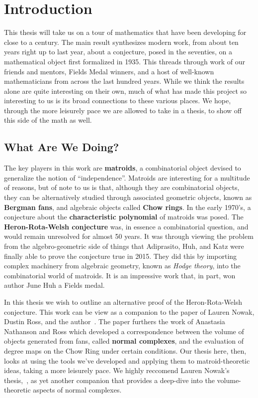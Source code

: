 \documentclass[12pt,oneside]{../../sfsuthesis}
\begin{document}
\chapter{Introduction}

This thesis will take us on a tour of mathematics that have been developing for close to a century.
The main result synthesizes modern work, from about ten years right up to last year, about a conjecture, posed in the seventies, on a mathematical object first formalized in 1935.
This threads through work of our friends and mentors, Fields Medal winners, and a host of well-known mathematicians from across the last hundred years.
While we think the results alone are quite interesting on their own, much of what has made this project so interesting to us is its broad connections to these various places.
We hope, through the more leisurely pace we are allowed to take in a thesis, to show off this side of the math as well.

\section{What Are We Doing?}

The key players in this work are \textbf{matroids}, a combinatorial object devised to generalize the notion of ``independence''.
Matroids are interesting for a multitude of reasons, but of note to us is that, although they are combinatorial objects, they can be alternatively studied through associated geometric objects, known as \textbf{Bergman fans}, and algebraic objects called \textbf{Chow rings}.
In the early 1970's, a conjecture about the \textbf{characteristic polynomial} of matroids was posed.
The \textbf{Heron-Rota-Welsh conjecture} was, in essence a combinatorial question, and would remain unresolved for almost 50 years.
It was through viewing the problem from the algebro-geometric side of things that Adiprasito, Huh, and Katz were finally able to prove the conjecture true in 2015.
They did this by importing complex machinery from algebraic geometry, known as \emph{Hodge theory}, into the combinatorial world of matroids.
It is an impressive work that, in part, won author June Huh a Fields medal.

In this thesis we wish to outline an alternative proof of the Heron-Rota-Welsh conjecture.
This work can be view as a companion to the paper of Lauren Nowak, Dustin Ross, and the author~\cite{nowakMixedVolumesNormal2023}.
The paper furthers the work of Anastasia Nathanson and Ross which developed a correspondence between the volume of objects generated from fans, called \textbf{normal complexes}, and the evaluation of degree maps on the Chow Ring under certain conditions.
Our thesis here, then, looks at using the tools we've developed and applying them to matroid-theoretic ideas, taking a more leisurely pace.
We highly reccomend Lauren Nowak's thesis,~\cite{nowakMixedVolumesNormal2022}, as yet another companion that provides a deep-dive into the volume-theoretic aspects of normal complexes.
\end{document}
